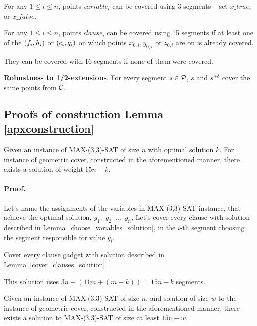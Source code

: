
\begin{lemma}
\label{choose_variables_solution}
For any $1 \le i \le n$, points $variable_i$
can be covered using 3 segments -- set $x\_true_i$ or $x\_false_i$
\end{lemma}


\begin{lemma}
\label{cover_clauses_solution}
For any $1 \le i \le n$, points $clause_i$
can be covered using 15 segments if at least one of the $(f_i, h_i)$
or $(c_i, g_i)$ on which points $x_{0, i}, y_{0, i}$ or $z_{0, i}$
are on is already covered.

They can be covered with 16 segments if none of them were covered.
\end{lemma}


\begin{lemma}
\textbf{Robustness to 1/2-extensions}. For every segment $s \in \mathcal{P}$,
$s$ and $s^{+\delta}$ cover the same points from $\mathcal{C}$.
\end{lemma}


\subsection{Proofs of construction Lemma \ref{apxconstruction}}
\begin{lemma}
	\label{construction_correctness}
	Given an instance of MAX-(3,3)-SAT of size $n$
	with optimal solution $k$.
	For instance of geometric cover, constructed
	in the aforementioned manner, 
	there exists a solution of weight $15n - k$.
\end{lemma}
\paragraph{Proof.}
Let's name the assignments of the variables in MAX-(3,3)-SAT instance,
that achieve the optimal solution,
$y_1$,~$y_2$~$\ldots$~$y_n$,
Let's cover every clause with solution described in
Lemma~\ref{choose_variables_solution},
in the $i$-th segment choosing the segment responsible for value $y_i$.

Cover every clause gadget with solution described in
Lemma~\ref{cover_clauses_solution}.

This solution uses $3n + (11m + (m-k)) = 15n - k$ segments.

\begin{lemma}
	\label{construction_completness}
	Given an instance of MAX-(3,3)-SAT of size $n$,
	and solution of size $w$ to the instance of geometric cover,
	constructed in the aforementioned manner, 
	there exists a solution to MAX-(3,3)-SAT of size at least $15n - w$.
\end{lemma}
